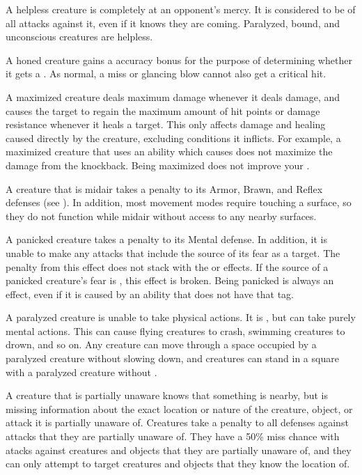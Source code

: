    A helpless creature is completely at an opponent's mercy.
  It is considered to be \unaware of all attacks against it, even if it knows they are coming.
  Paralyzed, bound, and unconscious creatures are helpless.

   A honed creature gains a  accuracy bonus for the purpose of determining whether it gets a .
  As normal, a miss or glancing blow cannot also get a critical hit.

   A maximized creature deals maximum damage whenever it deals damage, and causes the target to regain the maximum amount of hit points or damage resistance whenever it heals a target.
  This only affects damage and healing caused directly by the creature, excluding conditions it inflicts.
  For example, a maximized creature that uses an ability which causes  does not maximize the damage from the knockback.
  Being maximized does not improve your .

   A creature that is midair takes a  penalty to its Armor, Brawn, and Reflex defenses (see ).
  In addition, most movement modes require touching a surface, so they do not function while midair without access to any nearby surfaces.

   A panicked creature takes a  penalty to its Mental defense.
  In addition, it is unable to make any attacks that include the source of its fear as a target.
  The penalty from this effect does not stack with the \frightened or \panicked effects.
  If the source of a panicked creature's fear is , this effect is broken.
  Being panicked is always an  effect, even if it is caused by an ability that does not have that tag.

   A paralyzed creature is unable to take physical actions. It is \helpless, but can take purely mental actions. This can cause flying creatures to crash, swimming creatures to drown, and so on. Any creature can move through a space occupied by a paralyzed creature without slowing down, and creatures can stand in a square with a paralyzed creature without \squeezing.

   A creature that is partially unaware knows that something is nearby, but is missing information about the exact location or nature of the creature, object, or attack it is partially unaware of.
  Creatures take a  penalty to all defenses against attacks that they are partially unaware of.
  They have a 50\% miss chance with  atacks against creatures and objects that they are partially unaware of, and they can only attempt to target creatures and objects that they know the location of.

